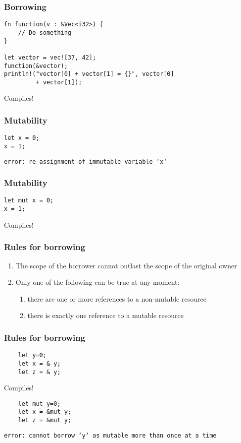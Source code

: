 \documentclass{beamer}
\begin{document}
\begin{frame}[fragile]
\frametitle{Borrowing}
\begin{lstlisting}
fn function(v : &Vec<i32>) {
    // Do something
}

let vector = vec![37, 42];
function(&vector);
println!("vector[0] + vector[1] = {}", vector[0]
         + vector[1]);
\end{lstlisting}

Compiles! \Checkmark
\end{frame}


\begin{frame}[fragile]
\frametitle{Mutability}

\begin{lstlisting}
let x = 0;
x = 1;
\end{lstlisting}

\texttt{error: re-assignment of immutable variable `x`}
\end{frame}



\begin{frame}[fragile]
\frametitle{Mutability}

\begin{lstlisting}
let mut x = 0;
x = 1;
\end{lstlisting}

Compiles! \Checkmark
\end{frame}

\begin{frame}
\frametitle{Rules for borrowing}
\begin{enumerate}
    \item The scope of the borrower cannot outlast the scope of the original owner
\item Only one of the following can be true at any moment:
    \begin{enumerate}
        \item there are one or more references to a non-mutable resource
        \item there is exactly one reference to a mutable resource
    \end{enumerate}
\end{enumerate}
\end{frame}


\begin{frame}[fragile]
\frametitle{Rules for borrowing}

\begin{lstlisting}
    let y=0;
    let x = & y; 
    let z = & y;
\end{lstlisting}

Compiles! \Checkmark

\pause 

\begin{lstlisting}
    let mut y=0;
    let x = &mut y; 
    let z = &mut y;
\end{lstlisting}

\texttt{error: cannot borrow `y` as mutable more than once at a time}

\end{frame}
\end{document}

